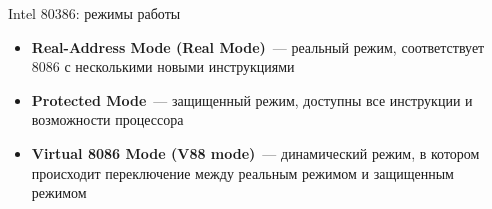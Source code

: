 \documentclass[aspectratio=169,14pt]{beamer}
\begin{document}
\begin{frame}{Intel 80386: режимы работы}
    \begin{itemize}
        \item \textbf{Real-Address Mode (Real Mode)}~--- реальный режим,
        соответствует 8086 с несколькими новыми инструкциями
        \item \textbf{Protected Mode}~--- защищенный режим, доступны
        все инструкции и возможности процессора
        \item \textbf{Virtual 8086 Mode (V88 mode)}~--- динамический
        режим, в котором происходит переключение между реальным режимом
        и защищенным режимом
    \end{itemize}
\end{frame}
\end{document}
